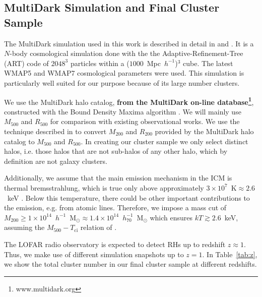 \documentclass[traditabstract]{aa}
\def\C#1{{\bf #1}}
\newcommand{\rmn}{\mathrm}
\begin{document}
\subsection{MultiDark Simulation and Final Cluster Sample}
\label{sec:2.1}
The MultiDark simulation used in this work is
described in detail in \cite{2011arXiv1104.5130P} and
\cite{2011arXiv1109.0003R}.  It is a $N$-body cosmological simulation done with
the the Adaptive-Refinement-Tree (ART) code \citep{1997ApJS..111...73K} of
$2048^3$ particles within a ($1000$~Mpc~$h^{-1}$)$^3$ cube. The latest WMAP5 and
WMAP7 cosmological parameters were used. This simulation is particularly well
suited for our purpose because of its large number clusters.
 
We use the MultiDark halo catalog, \C{from the MultiDark on-line database\footnote{www.multidark.org}}, 
constructed with the Bound Density Maxima algorithm \citep{1997astro.ph.12217K}.  
We will mainly use $M_{500}$ and $R_{500}$ for comparison with existing observational works.  
We use the technique described in \cite{2003ApJ...584..702H} to convert $M_{200}$ and
$R_{200}$ provided by the MultiDark halo catalog to $M_{500}$ and $R_{500}$.  In
creating our cluster sample we only select distinct halos, i.e. those halos that
are not sub-halos of any other halo, which by definition are not galaxy clusters.

Additionally, we assume that the main emission mechanism in the ICM is thermal
bremsstrahlung, which is true only above approximately
$3\times10^{7}$~$\rmn{K}\approx2.6$~keV \citep{1988xrec.book.....S}. Below this
temperature, there could be other important contributions to the emission,
e.g. from atomic lines. Therefore, we impose a mass cut of
$M_{200}\geq1\times10^{14}$~$h^{-1}$~M$_{\odot}\approx1.4\times10^{14}$~$h_{70}^{-1}$~M$_{\odot}$
which ensures $kT \gtrsim 2.6$~keV, assuming the $M_{500} - T_{\rmn{ci}}$ relation
of \cite{2010MNRAS.406.1773M}.

The LOFAR radio observatory is expected to detect RHs up to redshift $z \approx
1$. Thus, we make use of different simulation snapshots up to $z=1$. In
Table~\ref{tab:z}, we show the total cluster number in our final cluster sample
at different redshifts.
\end{document}
